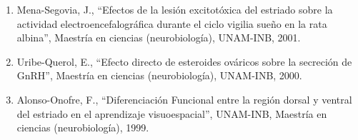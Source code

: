 \begin{enumerate}
\item Mena-Segovia, J., “Efectos de la lesión excitotóxica del estriado sobre la actividad electroencefalográfica durante el ciclo vigilia sueño en la rata 
albina”, Maestría en ciencias (neurobiología), UNAM-INB,   2001.

\item Uribe-Querol, E., “Efecto directo de esteroides ováricos sobre la secreción de GnRH”, Maestría en ciencias (neurobiología), UNAM-INB,   2000.

\item Alonso-Onofre, F., “Diferenciación Funcional entre la región dorsal y ventral del estriado en el aprendizaje visuoespacial”, UNAM-INB, Maestría en 
ciencias 
(neurobiología),   1999.

\end{enumerate}


